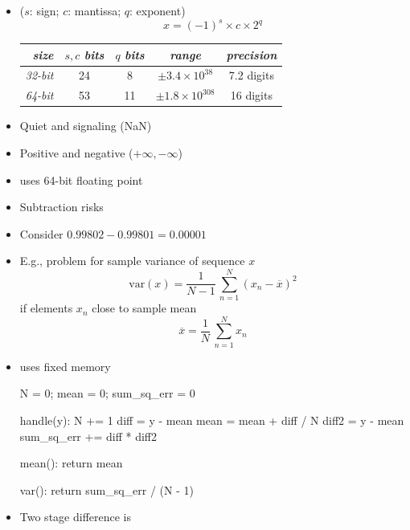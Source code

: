 \documentclass[10pt]{report}
\begin{document}
%
\begin{itemize}
\item {} ($s$: sign; $c$: mantissa; $q$: exponent)
{\large
\[
x = (-1)^s \times c \times 2^q
\]
}
\begin{center}
\begin{tabular}{r|c|c|cc}
{\slshape size} & $s, c$ {\slshape bits} & $q$ {\slshape bits}
& {\slshape range} & {\slshape precision}
\\ \hline
{\slshape 32-bit} & 24 & 8
& $\pm 3.4 \times 10^{38}$ & 7.2 digits
\\[4pt]
{\slshape 64-bit} & 53 & 11
& $\pm 1.8 \times 10^{308}$ & 16 digits
\end{tabular}
\end{center}
\item Quiet and signaling  (NaN)
\item Positive and negative  ($+\infty, -\infty$)
\item {} uses 64-bit floating point
\end{itemize}


%
\begin{itemize}
\item Subtraction risks 
\item Consider $0.99802 - 0.99801 = 0.00001$
\item E.g., problem for sample variance of sequence $x$
\[
\mbox{var}(x) = \frac{1}{N - 1} \, \sum_{n = 1}^N (x_n - \overline{x})^2
\]
if elements $x_n$ close to sample mean
\[
\overline{x} = \frac{1}{N} \, \sum_{n=1}^N x_n
\]
\end{itemize}

\begin{itemize}
\item {} uses fixed memory
\begin{stancode}
N = 0;    mean = 0;    sum_sq_err = 0

handle(y):
    N += 1
    diff = y - mean
    mean = mean + diff / N
    diff2 = y - mean
    sum_sq_err += diff * diff2

mean():  return mean

var():  return sum_sq_err / (N - 1)
\end{stancode}
\item Two stage difference is 
\end{itemize}
\end{document}

